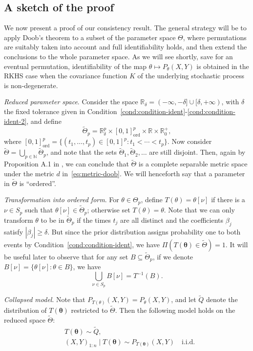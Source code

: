 \documentclass{article}
\numberwithin{equation}{section}
\theoremstyle{plain}
\theoremstyle{definition}
\newcommand{\N}{\mathbb{N}}
\newcommand{\R}{\mathbb{R}}
\newcommand{\tTheta}{\tilde{\Theta}}
\begin{document}
\subsection{A sketch of the proof}

 We now present a proof of our consistency result. The general strategy will be to apply Doob's theorem to a subset of the parameter space \(\Theta\), where permutations are suitably taken into account and full identifiability holds, and then extend the conclusions to the whole parameter space. As we will see shortly, save for an eventual permutation, identifiability of the map \(\theta \mapsto P_\theta(X,Y)\) is obtained in the RKHS case when the covariance function \(K\) of the underlying stochastic process is non-degenerate.

\textit{Reduced parameter space}. Consider the space \(\R_\delta = (-\infty, -\delta]\cup[\delta, +\infty)\), with \(\delta\) the fixed tolerance given in Condition~\ref{cond:condition-ident}-\ref{cond:condition-ident-2}, and define 
\[\tTheta_p = \R^p_\delta \times [0,1]^p_{\text{ord}} \times \R \times \R^+_0,
\]
where \(
[0,1]^p_{\text{ord}} =\{(t_1,\dots, t_p) \in [0,1]^p: t_1 < \cdots < t_p\}
\). Now consider \(\tTheta = \bigcup_{p\in \N}\tTheta_p\), and note that the sets \(\tTheta_1,\tTheta_2,\ldots\) are still disjoint. Then, again by Proposition A.1 in \citet{miller2023consistency}, we can conclude that \(\tTheta\) is a complete separable metric space under the metric \(d\) in~\eqref{eq:metric-doob}. We will henceforth say that a parameter in \(\tTheta\) is ``ordered''.

\textit{Transformation into ordered form}. For \(\theta\in\Theta_p\), define \(T(\theta)=\theta[\nu]\) if there is a \(\nu\in S_p\) such that \(\theta[\nu]\in \tTheta_p\); otherwise set \(T(\theta)=\theta\). Note that we can only transform \(\theta\) to be in \(\tTheta_p\) if the times \(t_j\) are all distinct and the coefficients \(\beta_j\) satisfy \(|\beta_j|\geq\delta\). But since the prior distribution assigns probability one to both events by Condition~\ref{cond:condition-ident}, we have \(\Pi(T(\bm\theta)\in\tTheta)=1\). It will be useful later to observe that for any set \(B\subseteq \tTheta_p\), if we denote \(B[\nu] = \{\theta[\nu]: \theta \in B\}\), we have
\begin{equation}\label{eq:inverse-image-T}
  \bigcup_{\nu\in S_p} B[\nu] = T^{-1}(B).
\end{equation}

\textit{Collapsed model}. Note that \(P_{T(\theta)}(X,Y)=P_{\theta}(X,Y)\), and let \(\tilde Q\) denote the distribution of \(T(\bm \theta)\) restricted to \(\tTheta\). Then the following model holds on the reduced space \(\tTheta\):
\begin{equation}\label{eq:model-linear-collapsed}
  \begin{aligned}
     & T(\bm \theta) \sim \tilde{Q},                                               \\
     & (X,Y)_{1:n}\mid T(\bm\theta) \sim P_{T(\bm\theta)}(X,Y) \quad \text{i.i.d.}
  \end{aligned}
\end{equation}
\end{document}
